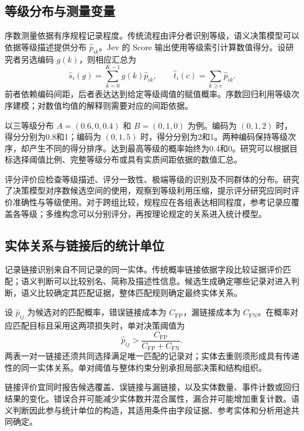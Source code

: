 \documentclass[UTF8,a4paper,zihao=-4,fontset=fandol]{ctexart}
\begin{document}
\subsection{等级分布与测量变量}

序数测量依据有序规程记录程度。传统流程由评分者识别等级，语义决策模型可以依据等级描述提供分布 $\widehat p_{ik}$。Jev 的 Score 输出使用等级索引计算数值得分\citep{typesafe-score}。设研究者另选编码 $g(k)$，则相应汇总为
\begin{equation}
 \widehat s_i(g)=\sum_{k=0}^{K-1}g(k)\widehat p_{ik},\qquad
 \widehat t_i(c)=\sum_{k\geq c}\widehat p_{ik}.
 \label{eq:ordinal}
\end{equation}
前者依赖编码间距，后者表达达到给定等级阈值的赋值概率。序数回归利用等级次序建模\citep{mccullagh1980}；对数值均值的解释则需要对应的间距依据。

以三等级分布 $A=(0.6,0,0.4)$ 和 $B=(0,1,0)$ 为例。编码为 $(0,1,2)$ 时，得分分别为0.8和1；编码为 $(0,1,5)$ 时，得分分别为2和1。两种编码保持等级次序，却产生不同的得分排序。达到最高等级的概率始终为0.4和0。研究可以根据目标选择阈值比例、完整等级分布或具有实质间距依据的数值汇总。

评分评价应检查等级描述、评分一致性、极端等级的识别及不同群体的分布。\citet{gao2026}研究了决策模型对序数候选空间的使用，观察到等级利用压缩，提示评分研究应同时评价准确性与等级使用。对于跨组比较，规程应在各组表达相同程度，参考记录应覆盖各等级；多维构念可以分别评分，再按理论规定的关系进入统计模型。

\subsection{实体关系与链接后的统计单位}

记录链接识别来自不同记录的同一实体。传统概率链接依据字段比较证据评价匹配\citep{fellegi1969}；语义判断可以比较别名、简称及描述性信息。候选生成确定哪些记录对进入判断，语义比较确定其匹配证据，整体匹配规则确定最终实体关系。

设 $\widehat p_{ij}$ 为候选对的匹配概率，错误链接成本为 $C_{\mathrm{FP}}$，漏链接成本为 $C_{\mathrm{FN}}$。在概率对应匹配目标且采用这两项损失时，单对决策阈值为
\begin{equation}
 \widehat p_{ij}>\frac{C_{\mathrm{FP}}}{C_{\mathrm{FP}}+C_{\mathrm{FN}}}.
 \label{eq:linkage}
\end{equation}
两表一对一链接还须共同选择满足唯一匹配的记录对；实体去重则须形成具有传递性的同一实体关系。单对阈值与整体约束分别承担局部决策和结构组织。

链接评价宜同时报告候选覆盖、误链接与漏链接，以及实体数量、事件计数或回归结果的变化。错误合并可能减少实体数并混合属性，漏合并可能增加重复计数。语义判断因此参与统计单位的构造，其适用条件由字段证据、参考实体和分析用途共同确定。
\end{document}
